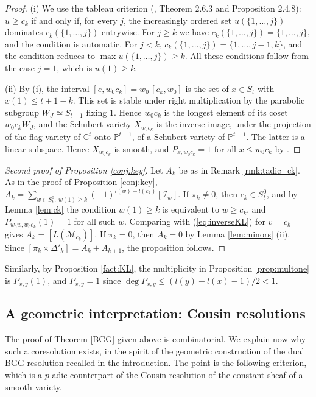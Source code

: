 \documentclass[a4paper,12pt,leqno]{amsart}
\newcommand{\caI}{\mathcal{I}}
\newcommand{\caM}{\mathcal{M}}
\theoremstyle{plain}
\theoremstyle{definition}
\theoremstyle{definition}
\begin{document}
\begin{proof}
(i) We use the tableau criterion (\cite{BB05}, Theorem 2.6.3 and Proposition 2.4.8): $u\geq c_k$
if and only if, for every $j$, the increasingly ordered set $u(\{1,\ldots,j\})$ dominates
$c_k(\{1,\ldots,j\})$ entrywise.
 For $j\geq k$ we have $c_k(\{1,\ldots,j\})=\{1,\ldots,j\}$, and the condition is automatic.
  For $j<k$, $c_k(\{1,\ldots,j\})=\{1,\ldots,j-1,k\}$, and the condition reduces to $\max
  u(\{1,\ldots,j\})\geq k$.
   All these conditions follow from the case $j=1$, which is $u(1)\geq k$.

(ii) By (i), the interval $[e,w_0c_k]=w_0\,[c_k,w_0]$ is the set of $x\in S_t$ with $x(1)\leq t+1-k$.
This set is stable under right multiplication by the parabolic subgroup $W_J\simeq S_{t-1}$ fixing $1$.
Hence $w_0c_k$ is the longest element of its coset $w_0c_kW_J$, and the Schubert variety $X_{w_0c_k}$
is the inverse image, under the projection of the flag variety of $\mathbb{C}^t$ onto $\mathbb{P}^{t-1}$,
of a Schubert variety of $\mathbb{P}^{t-1}$. The latter is a linear subspace. Hence $X_{w_0c_k}$ is smooth,
and $P_{x,w_0c_k}=1$ for all $x\leq w_0c_k$ by \cite{KL80}.
\end{proof}


\begin{proof}[Second proof of Proposition \ref{conj:key}]
Let $A_k$ be as in Remark \ref{rmk:tadic_ck}. As in the proof of Proposition \ref{conj:key},
$A_k=\sum_{w\in S^0_t,\ w(1)\geq k}(-1)^{l(w)-l(c_k)}[\caI_w]$. If $\pi_k\neq 0$, then $c_k\in
S^0_t$, and by Lemma \ref{lem:ck} the condition $w(1)\geq k$ is equivalent to $w\geq c_k$, and
$P_{w_0w,w_0c_k}(1)=1$ for all such $w$. Comparing with (\ref{eq:inverseKL}) for $v=c_k$ gives
$A_k=[L(\caM_{c_k})]$. If $\pi_k=0$, then $A_k=0$ by Lemma \ref{lem:minors} (ii). Since
$[\pi_k\times\Delta'_k]=A_k+A_{k+1}$, the proposition follows.
\end{proof}

Similarly, by Proposition \ref{fact:KL}, the multiplicity in Proposition \ref{prop:multone} is
$P_{x,y}(1)$, and $P_{x,y}=1$ since $\deg P_{x,y}\leq(l(y)-l(x)-1)/2<1$.




\subsection{A geometric interpretation: Cousin resolutions}\label{ssec:geomint}
The proof of Theorem \ref{BGG} given above is combinatorial. We explain now why such a coresolution
exists, in the spirit of the geometric construction of the dual BGG resolution recalled in the
introduction. The point is the following criterion, which is a $p$-adic counterpart of the Cousin
resolution of the constant sheaf of a smooth variety.
\end{document}
